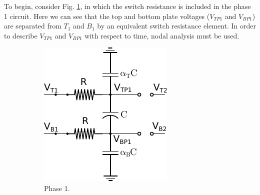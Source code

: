 	To begin, consider Fig. \ref{fig:Phase1Res}, in which the switch resistance is included in the phase 1 circuit. Here we can see that the top and bottom plate voltages ($V_{TP1}$ and $V_{BP1}$) are separated from $T_1$ and $B_1$ by an equivalent switch resistance element. In order to describe $V_{TP1}$ and $V_{BP1}$ with respect to time, nodal analysis must be used. 
	
	\begin{figure}
		\centering
		\begin{subfigure}{0.35\linewidth}
			\includegraphics[width=\linewidth]{4Terminal/Figures/Phase1EQ.pdf}
			\caption{Phase 1.}
			\label{fig:Phase1Res}
		\end{subfigure}
		\hfill
		\begin{subfigure}{0.35\linewidth}

\end{subfigure}
\end{figure}
